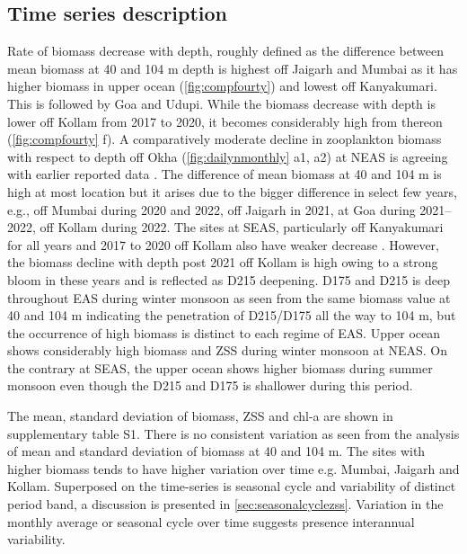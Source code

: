 \documentclass{article}
\begin{document}
	\subsection{Time series description}
	\label{sec:timeseries}
	Rate of biomass decrease with depth, roughly defined as the difference between mean biomass at 40  and 104 m depth is highest off Jaigarh and Mumbai as it has higher biomass in upper ocean (\cref{fig:compfourty}) and lowest off Kanyakumari. This is followed by Goa and Udupi. While the biomass decrease with depth is lower off Kollam from 2017 to 2020, it becomes considerably high from thereon (\cref{fig:compfourty} f). A comparatively moderate decline in zooplankton biomass with respect to depth off Okha (\cref{fig:dailynmonthly} a1, a2) at NEAS is agreeing with earlier reported data \citep{wishner1998mesozooplankton, madhupratap2001mesozooplankton, smith2005mesozooplankton,jyothibabu2010re}. The difference of mean biomass at 40 and 104 m is high at most location but it arises due to the bigger difference in select few years, e.g., off Mumbai during 2020 and 2022, off Jaigarh in 2021, at Goa during 2021--2022, off Kollam during 2022. The sites at SEAS, particularly off Kanyakumari for all years and 2017 to 2020 off Kollam also have weaker decrease \citep{madhupratap2001mesozooplankton, jyothibabu2010re, aparna2022seasonal}. However, the biomass decline with depth post 2021 off Kollam is high owing to a strong bloom in these years and is reflected as D215 deepening. D175 and D215 is deep throughout EAS during winter monsoon as seen from the same biomass value at 40 and 104 m indicating the penetration of D215/D175 all the way to 104 m, but the occurrence of high biomass is distinct to each regime of EAS. Upper ocean shows considerably high biomass and ZSS during winter monsoon at NEAS. On the contrary at SEAS, the upper ocean shows higher biomass during summer monsoon even though the D215 and D175 is shallower during this period. 
		
	The mean, standard deviation of biomass, ZSS and chl-a are shown in supplementary table S1. There is no consistent variation as seen from the analysis of mean and standard deviation of biomass at 40 and 104 m. The sites with higher biomass tends to have higher variation over time e.g. Mumbai, Jaigarh and Kollam. Superposed on the time-series is seasonal cycle and variability of distinct period band, a discussion is presented in \autoref{sec:seasonalcyclezss}. Variation in the monthly average or seasonal cycle over time suggests presence interannual variability. 
		
\end{document}
